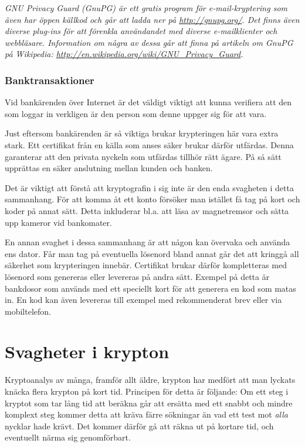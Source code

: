 \documentclass{article}
\begin{document}
		\emph{GNU Privacy Guard (GnuPG) är ett gratis program för e-mail-kryptering som även har öppen källkod och går att ladda ner på \url{http://gnupg.org/}. Det finns även diverse plug-ins för att förenkla användandet med diverse e-mailklienter och webbläsare. Information om några av dessa går att finna på artikeln om GnuPG på Wikipedia: \url{http://en.wikipedia.org/wiki/GNU_Privacy_Guard}.}

		\subsubsection {Banktransaktioner}

		Vid bankärenden över Internet är det väldigt viktigt att kunna verifiera att den som loggar in verkligen är den person som denne uppger sig för att vara.

		Just eftersom bankärenden är så viktiga brukar krypteringen här vara extra stark. Ett certifikat från en källa som anses säker brukar därför utfärdas. Denna garanterar att den privata nyckeln som utfärdas tillhör rätt ägare. På så sätt upprättas en säker anslutning mellan kunden och banken.

		Det är viktigt att förstå att kryptografin i sig inte är den enda svagheten i detta sammanhang. För att komma åt ett konto försöker man istället få tag på kort och koder på annat sätt. Detta inkluderar bl.a. att läsa av magnetremsor och sätta upp kameror vid bankomater.

		En annan svaghet i dessa sammanhang är att någon kan övervaka och använda ens dator. Får man tag på eventuella lösenord bland annat går det att kringgå all säkerhet som krypteringen innebär. Certifikat brukar därför kompletteras med lösenord som genereras eller levereras på andra sätt. Exempel på detta är bankdosor som används med ett speciellt kort för att generera en kod som matas in. En kod kan även levereras till exempel med rekommenderat brev eller via mobiltelefon.

\section {Svagheter i krypton}

Kryptoanalys av många, framför allt äldre, krypton har medfört att man lyckats knäcka flera krypton på kort tid. Principen för detta är följande: Om ett steg i kryptot som tar lång tid att beräkna går att ersätta med ett snabbt och mindre komplext steg kommer detta att kräva färre sökningar än vad ett test mot \emph{alla} nycklar hade krävt. Det kommer därför gå att räkna ut på kortare tid, och eventuellt närma sig genomförbart.
\end{document}
